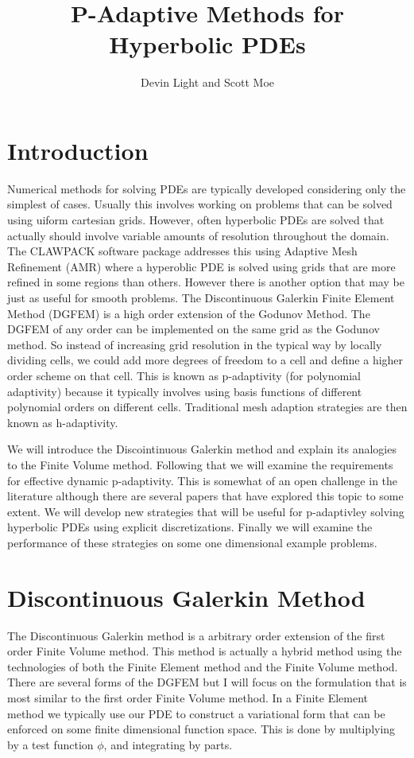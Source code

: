 \documentclass[10]{amsart}
\title[]{P-Adaptive Methods for Hyperbolic PDEs}
\author{Devin Light and Scott Moe}
\begin{document}
\maketitle

\section{Introduction}

Numerical methods for solving PDEs are typically developed considering only the simplest of cases. Usually this
involves working on problems that can be solved using uiform cartesian grids. However, often hyperbolic PDEs
are solved that actually should involve variable amounts of resolution throughout the domain. The CLAWPACK
software package addresses this using Adaptive Mesh Refinement (AMR) where a hyperoblic PDE is solved using grids
that are more refined in some regions than others. However there is another option that may be just as useful
for smooth problems. The Discontinuous Galerkin Finite Element Method (DGFEM) is a high order
extension of the Godunov Method. The DGFEM of any order can be implemented on the same grid as the Godunov
method. So instead of increasing grid resolution in the typical way by locally dividing cells, we could add more
degrees of freedom to a cell and define a higher order scheme on that cell. This is known as p-adaptivity
(for polynomial adaptivity) because it typically involves using basis functions of different polynomial orders on different
cells. Traditional mesh adaption strategies are then known as h-adaptivity. 

We will introduce the Discointinuous Galerkin method and explain its analogies to the Finite Volume method. Following that
we will examine the requirements for effective dynamic p-adaptivity. This is somewhat of an open challenge in the literature
although there are several papers that have explored this topic to some extent. We will develop new strategies
that will be useful for p-adaptivley solving hyperbolic PDEs using explicit discretizations. Finally we will examine
the performance of these strategies on some one dimensional example problems.

\section{Discontinuous Galerkin Method}

The Discontinuous Galerkin method is a arbitrary order extension of the first order Finite Volume method.
This method is actually a hybrid method using the technologies of both the Finite Element method and the Finite
Volume method. There are several forms of the DGFEM but I will focus on the formulation that is most similar to 
the first order Finite Volume method. In a Finite Element method we typically use our PDE to construct a variational
form that can be enforced on some finite dimensional function space. This is done by multiplying by a test function $\phi$,
and integrating by parts.
\end{document}
